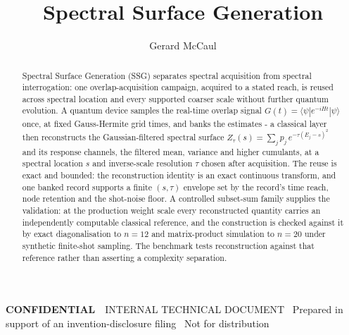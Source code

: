 \documentclass[reprint,aps,prx,showpacs,bibfootnote,preprintnumbers,superscriptaddress,amsmath,amssymb]{revtex4-2}
\newcommand{\notfordistribution}{%
  \textcolor{acc}{\textbf{CONFIDENTIAL}}\ \textcolor{faint}{\textemdash\ INTERNAL TECHNICAL DOCUMENT \textperiodcentered\ Prepared in support of an invention-disclosure filing \textperiodcentered\ Not for distribution}}
\begin{document}
\title{Spectral Surface Generation}
\author{Gerard McCaul}
\noaffiliation

\begin{abstract}
Spectral Surface Generation (SSG) separates spectral acquisition from spectral interrogation: one overlap-acquisition campaign, acquired to a stated reach, is reused across spectral location and every supported coarser scale without further quantum evolution. A quantum device samples the real-time overlap signal $G(t)=\langle\psi|e^{-iHt}|\psi\rangle$ once, at fixed Gauss-Hermite grid times, and banks the estimates - a classical layer then reconstructs the Gaussian-filtered spectral surface $Z_\tau(s)=\sum_j p_j\,e^{-\tau(E_j-s)^2}$ and its response channels, the filtered mean, variance and higher cumulants, at a spectral location $s$ and inverse-scale resolution $\tau$ chosen after acquisition. The reuse is exact and bounded: the reconstruction identity is an exact continuous transform, and one banked record supports a finite $(s,\tau)$ envelope set by the record's time reach, node retention and the shot-noise floor. A controlled subset-sum family supplies the validation: at the production weight scale every reconstructed quantity carries an independently computable classical reference, and the construction is checked against it by exact diagonalisation to $n=12$ and matrix-product simulation to $n=20$ under synthetic finite-shot sampling. The benchmark tests reconstruction against that reference rather than asserting a complexity separation.
\end{abstract}

\maketitle

\begin{center}\small\notfordistribution\end{center}




















\end{document}
